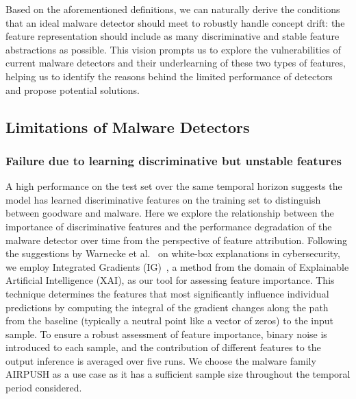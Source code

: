 Based on the aforementioned definitions, we can naturally derive the conditions that an ideal malware detector should meet to robustly handle concept drift: the feature representation should include as many discriminative and stable feature abstractions as possible. This vision prompts us to explore the vulnerabilities of current malware detectors and their underlearning of these two types of features, helping us to identify the reasons behind the limited performance of detectors and propose potential solutions.

\subsection{Limitations of Malware Detectors}
\subsubsection{Failure due to learning discriminative but unstable features}
A high performance on the test set over the same temporal horizon suggests the model has learned discriminative features on the training set to distinguish between goodware and malware. Here we explore the relationship between the importance of discriminative features and the performance degradation of the malware detector over time from the perspective of feature attribution. Following the suggestions by Warnecke et al.~\cite{IG_explain} on white-box explanations in cybersecurity, we employ Integrated Gradients (IG)~\cite{IG}, a method from the domain of Explainable Artificial Intelligence (XAI), as our tool for assessing feature importance. This technique determines the features that most significantly influence individual predictions by computing the integral of the gradient changes along the path from the baseline (typically a neutral point like a vector of zeros) to the input sample. To ensure a robust assessment of feature importance, binary noise is introduced to each sample, and the contribution of different features to the output inference is averaged over five runs. We choose the malware family AIRPUSH as a use case as it has a sufficient sample size throughout the temporal period considered.


